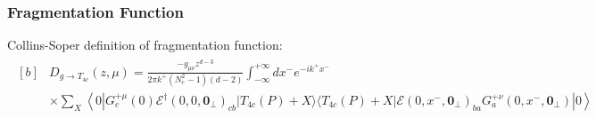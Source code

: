 \begin{frame}
	\frametitle{Fragmentation Function}

	Collins-Soper definition of fragmentation function: 
	{\footnotesize
	\begin{align*}
		\begin{aligned}[b]
			&D_{g \rightarrow T_{4c}}(z, \mu)= \frac{-g_{\mu \nu} z^{d-3}}{2 \pi k^{+}\left(N_{c}^{2}-1\right)(d-2)} \int_{-\infty}^{+\infty} d x^{-} e^{-i k^{+} x^{-}}
			\\
			&\times\sum_X \left\langle 0\left|G_{c}^{+\mu}(0) \mathcal{E}^{\dagger}\left(0,0, \mathbf{0}_{\perp}\right)_{c b}
			|T_{4c}(P)+X\rangle\langle T_{4c}(P)+X| \mathcal{E}\left(0, x^{-}, \mathbf{0}_{\perp}\right)_{b a} G_{a}^{+\nu}\left(0, x^{-}, \mathbf{0}_{\perp}\right)\right| 0\right\rangle
		\end{aligned}
	\end{align*}}
	

\end{frame}
